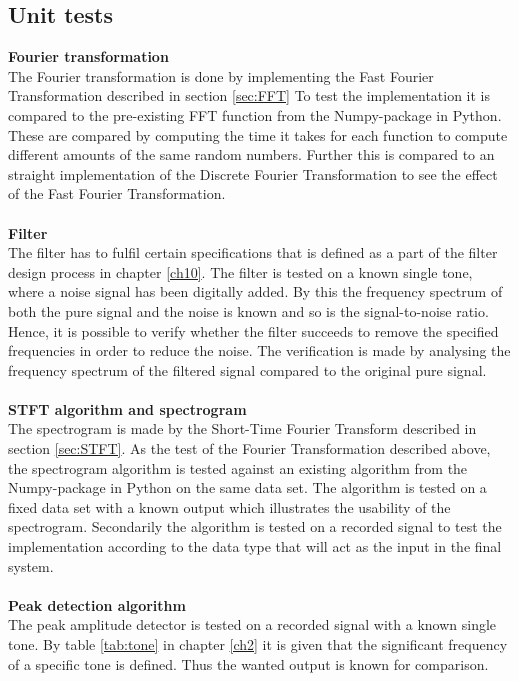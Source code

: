 \subsection{Unit tests} 
\textbf{Fourier transformation} \\
The Fourier transformation is done by implementing the Fast Fourier Transformation described in section \ref{sec:FFT} 
To test the implementation it is compared to the pre-existing FFT function from the Numpy-package in Python. These are compared by computing the time it takes for each function to compute different amounts of the same random numbers. Further this is compared to an straight implementation of the Discrete Fourier Transformation to see the effect of the Fast Fourier Transformation.\\
\\
\textbf{Filter}\\
The filter has to fulfil certain specifications that is defined as a part of the filter design process in chapter \ref{ch10}. The filter is tested on a known single tone, where a noise signal has been digitally added. By this the frequency spectrum of both the pure signal and the noise is known and so is the signal-to-noise ratio. Hence, it is possible to verify whether the filter succeeds to remove the specified frequencies in order to reduce the noise. The verification is made by analysing the frequency spectrum of the filtered signal compared to the original pure signal. \\
\\
\textbf{STFT algorithm and spectrogram}\\
The spectrogram is made by the Short-Time Fourier Transform described in section \ref{sec:STFT}. As the test of the Fourier Transformation described above, the spectrogram algorithm is tested against an existing algorithm from the Numpy-package in Python on the same data set. The algorithm is tested on a fixed data set with a known output which illustrates the usability of the spectrogram. Secondarily the algorithm is tested on a recorded signal to test the implementation according to the data type that will act as the input in the final system.\\\\
\textbf{Peak detection algorithm}\\
The peak amplitude detector is tested on a recorded signal with a known single tone. By table \ref{tab:tone} in chapter \ref{ch2} it is given that the significant frequency of a specific tone is defined. Thus the wanted output is known for comparison.         

